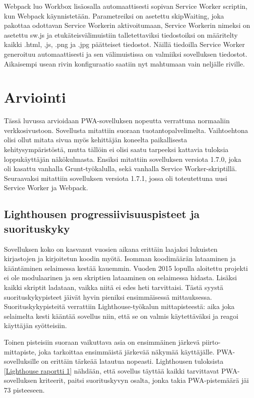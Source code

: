 \documentclass{tktltiki}
\begin{document}
Webpack luo Workbox lisäosalla automaattisesti sopivan Service Worker scriptin, kun Webpack käynnistetään. Parametreiksi on asetettu skipWaiting, joka pakottaa odottavan Service Workerin aktivoitumaan, Service Workerin nimeksi on asetettu sw.js ja etukäteisvälimuistiin talletettaviksi tiedostoiksi on määritelty kaikki .html, .js, .png ja .jpg päätteiset tiedostot. Näillä tiedoilla Service Worker generoituu automaattisesti ja sen välimuistissa on valmiiksi sovelluksen tiedostot. Aikaisempi usean rivin konfiguraatio saatiin nyt mahtumaan vain neljälle riville. 

\clearpage
\newpage
\section{Arviointi}

Tässä luvussa arvioidaan PWA-sovelluksen nopeutta verrattuna normaaliin verkkosivustoon. 
Sovellusta mitattiin suoraan tuotantopalvelimelta. Vaihtoehtona olisi ollut mitata sivua myös kehittäjän koneelta paikallisesta kehitysympäristöstä, mutta tällöin ei olisi saatu tarpeeksi kattavia tuloksia loppukäyttäjän näkökulmasta. Ensiksi mitattiin sovelluksen versiota 1.7.0, joka oli kasattu vanhalla Grunt-työkalulla, sekä vanhalla Service Worker-skriptillä. Seuraavaksi mitattiin sovelluksen versiota 1.7.1, jossa oli toteutettuna uusi Service Worker ja Webpack.

\subsection{Lighthousen progressiivisuuspisteet ja suorituskyky}

Sovelluksen koko on kasvanut vuosien aikana erittäin laajaksi lukuisten kirjastojen ja kirjoitetun koodin myötä. Isomman koodimäärän lataaminen ja kääntäminen selaimessa kestää kauemmin. Vuoden 2015 lopulla aloitettu projekti ei ole modulaarinen ja sen skriptien lataaminen on selaimessa hidasta. Lisäksi kaikki skriptit ladataan, vaikka niitä ei edes heti tarvittaisi. Tästä syystä suorituskykypisteet jäivät hyvin pieniksi ensimmäisessä mittauksessa. Suorituskykypisteitä verrattiin Lighthouse-työkalun mittapisteestä: aika joka selaimelta kesti kääntää sovellus niin, että se on valmis käytettäväksi ja reagoi käyttäjän syötteisiin.

Toinen pisteisiin suoraan vaikuttava asia on ensimmäinen järkevä piirto-mittapiste, joka tarkoittaa ensimmäistä järkevää näkymää käyttäjälle. PWA-sovelluksille on erittäin tärkeää latautua nopeasti.  Lighthousen tuloksista \ref{Lighthouse raportti 1} nähdään, että sovellus täyttää kaikki tarvittavat PWA-sovelluksen kriteerit, paitsi suorituskyvyn osalta, jonka takia PWA-pistemäärä jäi 73 pisteeseen.
\end{document}
